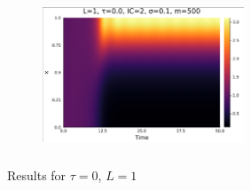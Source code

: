\documentclass[12pt,a4paper]{article}
\begin{document}
\begin{figure}[H]
\begin{subfigure}[b]{0.45\linewidth}
        \caption{}
        \label{}
    \end{subfigure}
    \hfill
    \begin{subfigure}[b]{0.45\linewidth}
        \centering
        \includegraphics[width=6cm,height = 4.5cm]{l1t0ic2s1e1.png}
        \caption{}
        \label{}
    \end{subfigure}
    \caption{Results for $\tau=0$, $L=1$}
    \label{}
\end{figure}
\end{document}
